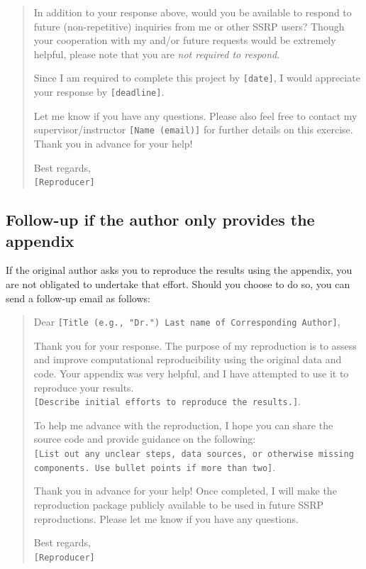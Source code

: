 \documentclass[
  openany]{book}
\begin{document}
\begin{quote}
In addition to your response above, would you be available to respond to future (non-repetitive) inquiries from me or other SSRP users? Though your cooperation with my and/or future requests would be extremely helpful, please note that you are \emph{not required to respond}.

Since I am required to complete this project by \texttt{{[}date{]}}, I would appreciate your response by \texttt{{[}deadline{]}}.

Let me know if you have any questions. Please also feel free to contact my supervisor/instructor \texttt{{[}Name\ (email){]}} for further details on this exercise. Thank you in advance for your help!

Best regards,\\
\texttt{{[}Reproducer{]}}
\end{quote}

\hypertarget{follow-up-if-the-author-only-provides-the-appendix}{%
\subsection{Follow-up if the author only provides the appendix}\label{follow-up-if-the-author-only-provides-the-appendix}}

If the original author asks you to reproduce the results using the appendix, you are not obligated to undertake that effort. Should you choose to do so, you can send a follow-up email as follows:

\begin{quote}
Dear \texttt{{[}Title\ (e.g.,\ "Dr.")\ Last\ name\ of\ Corresponding\ Author{]}},

Thank you for your response. The purpose of my reproduction is to assess and improve computational reproducibility using the original data and code. Your appendix was very helpful, and I have attempted to use it to reproduce your results.\texttt{{[}Describe\ initial\ efforts\ to\ reproduce\ the\ results.{]}}.

To help me advance with the reproduction, I hope you can share the source code and provide guidance on the following: \texttt{{[}List\ out\ any\ unclear\ steps,\ data\ sources,\ or\ otherwise\ missing\ components.\ Use\ bullet\ points\ if\ more\ than\ two{]}}.

Thank you in advance for your help! Once completed, I will make the reproduction package publicly available to be used in future SSRP reproductions. Please let me know if you have any questions.

Best regards,\\
\texttt{{[}Reproducer{]}}
\end{quote}
\end{document}
